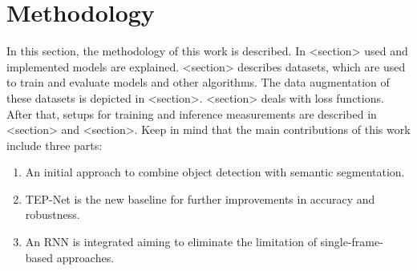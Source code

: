 \chapter{Methodology}
\label{sec:methodology}


In this section, the methodology of this work is described.
In <section> used and implemented models are explained.
<section> describes datasets, which are used to train and evaluate models and other algorithms.
The data augmentation of these datasets is depicted in <section>.
<section> deals with loss functions. After that, setups for training and inference measurements are described in <section> and <section>.
Keep in mind that the main contributions of this work include three parts:

\begin{enumerate}
    \item An initial approach to combine object detection with semantic segmentation.
    \item TEP-Net \cite{tepNet2024} is the new baseline for further improvements in accuracy and robustness.
    \item An RNN is integrated aiming to eliminate the limitation of single-frame-based approaches.
\end{enumerate}











